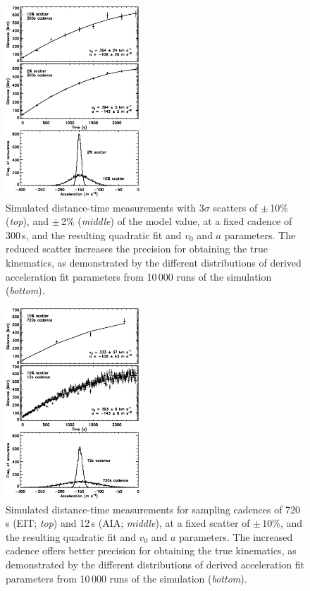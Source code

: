 \documentclass[referee]{aa}
\begin{document}
\begin{figure}[!t]
\begin{center}
\includegraphics[width = 0.45\textwidth]{images/noise_hist_jpb.eps}
\caption{Simulated distance-time measurements with 3$\sigma$ scatters of $\pm$\,10\% (\emph{top}), and $\pm$\,2\% (\emph{middle}) of the model value, at a fixed cadence of $300$\,s, and the resulting quadratic fit and $v_0$ and $a$ parameters. The reduced scatter increases the precision for obtaining the true kinematics, as demonstrated by the different distributions of derived acceleration fit parameters from 10\,000 runs of the simulation (\emph{bottom}).}
\label{noise_hist_weight}
\end{center}
\end{figure}

\begin{figure}[!t]
\begin{center}
\includegraphics[width = 0.45\textwidth]{images/cad_hist_jpb.eps}
\caption{Simulated distance-time measurements for sampling cadences of 720\,s (EIT; \emph{top}) and 12\,s (AIA; \emph{middle}), at a fixed scatter of $\pm\,10\%$, and the resulting quadratic fit and $v_0$ and $a$ parameters. The increased cadence offers better precision for obtaining the true kinematics, as demonstrated by the different distributions of derived acceleration fit parameters from 10\,000 runs of the simulation (\emph{bottom}).}
\label{cad_hist_weight}
\end{center}
\end{figure}
\end{document}
